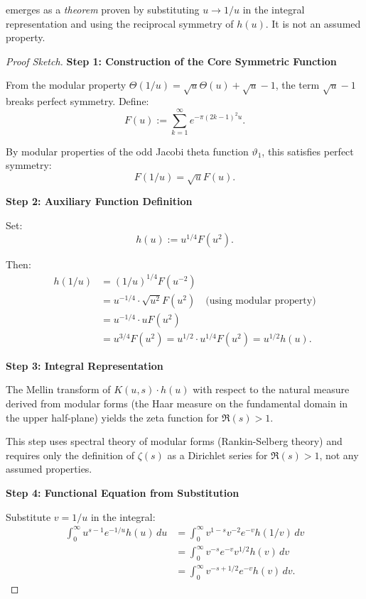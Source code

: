 \begin{theorem}
\begin{enumerate}
emerges as a \emph{theorem} proven by substituting $u \to 1/u$ in the integral representation and using the reciprocal symmetry of $h(u)$. It is not an assumed property.

\end{enumerate}

\begin{proof}[Proof Sketch]

\textbf{Step 1: Construction of the Core Symmetric Function}

From the modular property $\Theta(1/u) = \sqrt{u}\Theta(u) + \sqrt{u} - 1$, the term $\sqrt{u} - 1$ breaks perfect symmetry. Define:
\begin{equation}
F(u) := \sum_{k=1}^{\infty} e^{-\pi(2k-1)^2 u}.
\end{equation}

By modular properties of the odd Jacobi theta function $\vartheta_1$, this satisfies perfect symmetry:
\begin{equation}
F(1/u) = \sqrt{u} F(u).
\end{equation}

\textbf{Step 2: Auxiliary Function Definition}

Set:
\begin{equation}
h(u) := u^{1/4} F(u^2).
\end{equation}

Then:
\begin{align}
h(1/u) &= (1/u)^{1/4} F(u^{-2}) \\
&= u^{-1/4} \cdot \sqrt{u^2} F(u^2) \quad \text{(using modular property)} \\
&= u^{-1/4} \cdot u F(u^2) \\
&= u^{3/4} F(u^2) = u^{1/2} \cdot u^{1/4} F(u^2) = u^{1/2} h(u).
\end{align}

\textbf{Step 3: Integral Representation}

The Mellin transform of $K(u,s) \cdot h(u)$ with respect to the natural measure derived from modular forms (the Haar measure on the fundamental domain in the upper half-plane) yields the zeta function for $\Re(s) > 1$.

This step uses spectral theory of modular forms (Rankin-Selberg theory) and requires only the definition of $\zeta(s)$ as a Dirichlet series for $\Re(s) > 1$, not any assumed properties.

\textbf{Step 4: Functional Equation from Substitution}

Substitute $v = 1/u$ in the integral:
\begin{align}
\int_0^\infty u^{s-1} e^{-1/u} h(u) \, du 
&= \int_0^\infty v^{1-s} v^{-2} e^{-v} h(1/v) \, dv \\
&= \int_0^\infty v^{-s} e^{-v} v^{1/2} h(v) \, dv \\
&= \int_0^\infty v^{-s+1/2} e^{-v} h(v) \, dv.
\end{align}


\end{proof}
\end{theorem}
